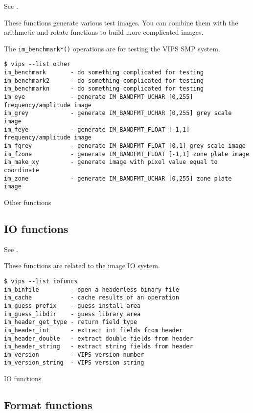 See .

These functions generate various test images. You can combine them with
the arithmetic and rotate functions to build more complicated images.

The \verb+im_benchmark*()+ operations are for testing the VIPS SMP system.

\begin{fig2}
\begin{verbatim}
$ vips --list other
im_benchmark       - do something complicated for testing
im_benchmark2      - do something complicated for testing
im_benchmarkn      - do something complicated for testing
im_eye             - generate IM_BANDFMT_UCHAR [0,255] frequency/amplitude image
im_grey            - generate IM_BANDFMT_UCHAR [0,255] grey scale image
im_feye            - generate IM_BANDFMT_FLOAT [-1,1] frequency/amplitude image
im_fgrey           - generate IM_BANDFMT_FLOAT [0,1] grey scale image
im_fzone           - generate IM_BANDFMT_FLOAT [-1,1] zone plate image
im_make_xy         - generate image with pixel value equal to coordinate
im_zone            - generate IM_BANDFMT_UCHAR [0,255] zone plate image
\end{verbatim}
\caption{Other functions}
\label{fg:other}
\end{fig2}

\subsection{IO functions}

See .

These functions are related to the image IO system. 

\begin{fig2}
\begin{verbatim}
$ vips --list iofuncs
im_binfile         - open a headerless binary file
im_cache           - cache results of an operation
im_guess_prefix    - guess install area
im_guess_libdir    - guess library area
im_header_get_type - return field type
im_header_int      - extract int fields from header
im_header_double   - extract double fields from header
im_header_string   - extract string fields from header
im_version         - VIPS version number
im_version_string  - VIPS version string
\end{verbatim}
\caption{IO functions}
\label{fg:io}
\end{fig2}

\subsection{Format functions}

